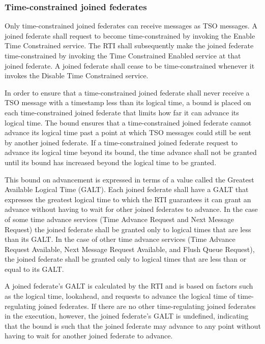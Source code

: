 \begin{compactstdpage}

    \subsubsection{Time-constrained joined federates}

    Only time-constrained joined federates can receive messages as TSO messages. A joined federate shall request to become time-constrained by invoking the Enable Time Constrained service. The RTI shall subsequently make the joined federate time-constrained by invoking the Time Constrained Enabled \rtiinitiated{} service at that joined federate. A joined federate shall cease to be time-constrained whenever it invokes the Disable Time Constrained service.

    In order to ensure that a time-constrained joined federate shall never receive a TSO message with a timestamp less than its logical time, a bound is placed on each time-constrained joined federate that limits how far it can advance its logical time. The bound ensures that a time-constrained joined federate cannot advance its logical time past a point at which TSO messages could still be sent by another joined federate. If a time-constrained joined federate request to advance its logical time beyond its bound, the time advance shall not be granted until its bound has increased beyond the logical time to be granted.

    This bound on advancement is expressed in terms of a value called the Greatest Available Logical Time (GALT). Each joined federate shall have a GALT that expresses the greatest logical time to which the RTI guarantees it can grant an advance without having to wait for other joined federates to advance. In the case of some time advance services (Time Advance Request and Next Message Request) the joined federate shall be granted only to logical times that are less than its GALT. In the case of other time advance services (Time Advance Request Available, Next Message Request Available, and Flush Queue Request), the joined federate shall be granted only to logical times that are less than or equal to its GALT.

    A joined federate's GALT is calculated by the RTI and is based on factors such as the logical time, lookahead, and requests to advance the logical time of time-regulating joined federates. If there are no other time-regulating joined federates in the execution, however, the joined federate's GALT is undefined, indicating that the bound is such that the joined federate may advance to any point without having to wait for another joined federate to advance.


\end{compactstdpage}

